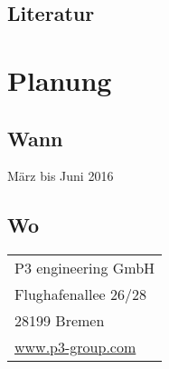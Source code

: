   \subsection{Literatur}
  \label{ssec:literatur}
    \nocite{*}
    \printbibliography[heading=none]

\section{Planung}
\label{sec:planung}

  \subsection{Wann}
  \label{ssec:wann}
    März bis Juni 2016

  \subsection{Wo}
  \label{ssec:wo}
    \begin{tabular}{l}
      P3 engineering GmbH\\
      Flughafenallee 26/28\\
      28199 Bremen\\
      \href{www.p3-group.com}{www.p3-group.com}\\
    \end{tabular}

